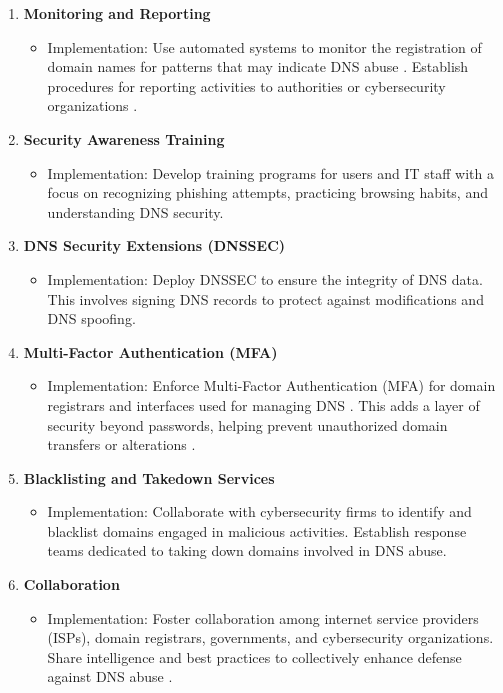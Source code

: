 \begin{enumerate}
    \item \textbf{Monitoring and Reporting}
    \begin{itemize}
        \item Implementation: Use automated systems to monitor the registration of domain names for patterns that may indicate DNS abuse \cite{icannndnssec}. Establish procedures for reporting activities to authorities or cybersecurity organizations \cite{lucas2021tls}.
    \end{itemize}
    \item \textbf{Security Awareness Training}
    \begin{itemize}
        \item Implementation: Develop training programs for users and IT staff with a focus on recognizing phishing attempts, practicing browsing habits, and understanding DNS security.
    \end{itemize}
    \item \textbf{DNS Security Extensions (DNSSEC)}
    \begin{itemize}
        \item Implementation: Deploy DNSSEC to ensure the integrity of DNS data. This involves signing DNS records to protect against modifications and DNS spoofing.
    \end{itemize}
    \item \textbf{Multi-Factor Authentication (MFA)}
    \begin{itemize}
        \item Implementation: Enforce Multi-Factor Authentication (MFA) for domain registrars and interfaces used for managing DNS \cite{icannndnssec}. This adds a layer of security beyond passwords, helping prevent unauthorized domain transfers or alterations \cite{moghaddam2014ecco}.
    \end{itemize}
    \item \textbf{Blacklisting and Takedown Services}
    \begin{itemize}
        \item Implementation: Collaborate with cybersecurity firms to identify and blacklist domains engaged in malicious activities. Establish response teams dedicated to taking down domains involved in DNS abuse.
    \end{itemize}
    \item \textbf{Collaboration}
    \begin{itemize}
        \item Implementation: Foster collaboration among internet service providers (ISPs), domain registrars, governments, and cybersecurity organizations. Share intelligence and best practices to collectively enhance defense against DNS abuse \cite{skopik2017collaborative}.

\end{itemize}
\end{enumerate}
